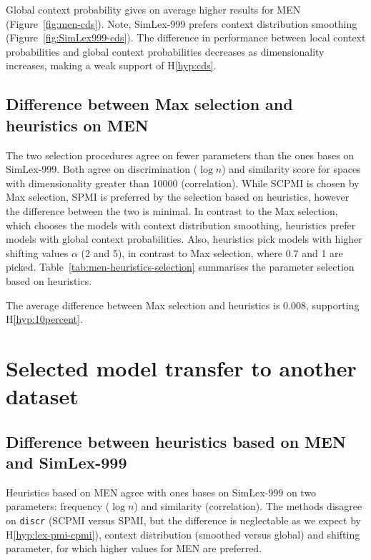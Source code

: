 
Global context probability gives on average higher results for MEN (Figure~\ref{fig:men-cds}). Note, SimLex-999 prefers context distribution smoothing (Figure~\ref{fig:SimLex999-cds}). The difference in performance between local context probabilities and global context probabilities decreases as dimensionality increases, making a weak support of H\ref{hyp:cds}.

\subsection{Difference between Max selection and heuristics on MEN}



The two selection procedures agree on fewer parameters than the ones bases on SimLex-999. Both agree on discrimination ($\log n$) and similarity score for spaces with dimensionality greater than 10000 (correlation). While SCPMI is chosen by Max selection, SPMI is preferred by the selection based on heuristics, however the difference between the two is minimal. In contrast to the Max selection, which chooses the models with context distribution smoothing, heuristics prefer models with global context probabilities. Also, heuristics pick models with higher shifting values $\alpha$ (2 and 5), in contrast to Max selection, where 0.7 and 1 are picked. Table~\ref{tab:men-heuristics-selection} summarises the parameter selection based on heuristics.

The average difference between Max selection and heuristics is 0.008, supporting H\ref{hyp:10percent}.

\section{Selected model transfer to another dataset}
\label{sec:select-model-transf}

\subsection{Difference between heuristics based on MEN and SimLex-999}

Heuristics based on MEN agree with ones bases on SimLex-999 on two parameters: frequency ($\log n$) and similarity (correlation). The methods disagree on \texttt{discr} (SCPMI versus SPMI, but the difference is neglectable as we expect by H\ref{hyp:lex-pmi-cpmi}), context distribution (smoothed versus global) and shifting parameter, for which higher values for MEN are preferred.

